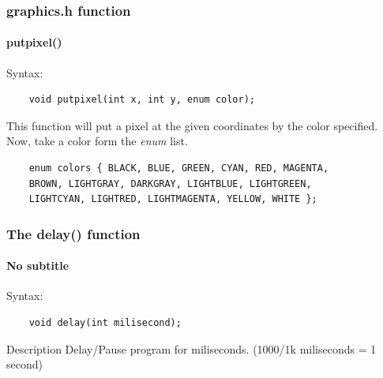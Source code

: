 { %
\frame
{
	\titlepage
}
}

\begin{frame}[fragile]
	\frametitle{graphics.h function}
	\framesubtitle{putpixel()}
	\pause
	\alert{Syntax:}
\begin{lstlisting}
	void putpixel(int x, int y, enum color);
\end{lstlisting}
\pause
This function will put a pixel at the given coordinates by the color specified.\pause \\
Now, take a color form the \emph{enum} list.
\begin{lstlisting}
	enum colors { BLACK, BLUE, GREEN, CYAN, RED, MAGENTA,
	BROWN, LIGHTGRAY, DARKGRAY, LIGHTBLUE, LIGHTGREEN,
	LIGHTCYAN, LIGHTRED, LIGHTMAGENTA, YELLOW, WHITE };
\end{lstlisting}
{}
\end{frame}

\begin{frame}[fragile]
\frametitle{The delay() function}
\framesubtitle{No subtitle}
\pause
\alert{Syntax:}
\begin{lstlisting}
	void delay(int milisecond);
\end{lstlisting}
\pause
\begin{block}{Description}
Delay/Pause program for miliseconds. (1000/1k miliseconds = 1 second)
\end{block}
\end{frame}

